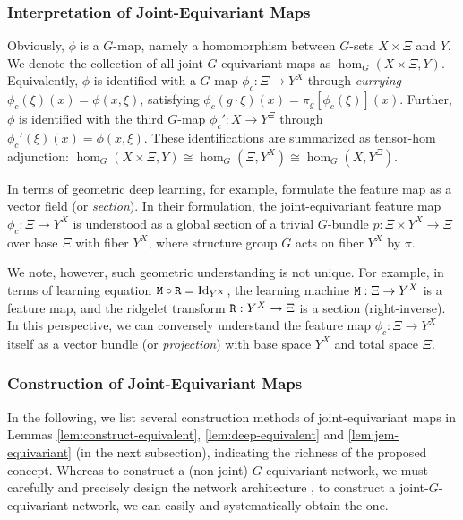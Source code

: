 \subsubsection{Interpretation of Joint-Equivariant Maps} \label{sec:interpretation}
Obviously, 
$\phi$ is a $G$-map, namely a homomorphism between $G$-sets $X \times \Xi$ and $Y$. We denote the collection of all joint-$G$-equivariant maps as $\hom_G(X \times \Xi, Y)$.
Equivalently, 
$\phi$ is identified with a $G$-map $\phi_c:\Xi \to Y^X$ through \emph{currying} $\phi_c(\xi)(x) = \phi(x,\xi)$, satisfying $\phi_c(g \cdot \xi)(x) = \pi_g[\phi_c(\xi)](x)$.
Further, $\phi$ is identified with the third $G$-map $\phi_c':X \to Y^\Xi$ through $\phi_c'(\xi)(x) = \phi(x,\xi)$.
These identifications are summarized as tensor-hom adjunction: $\hom_G(X \times \Xi, Y) \cong \hom_G(\Xi, Y^X) \cong \hom_G(X, Y^\Xi)$.

In terms of geometric deep learning, for example, \citet{Cohen2019} formulate the feature map as a vector field (or \emph{section}). In their formulation, the joint-equivariant feature map $\phi_c : \Xi \to Y^X$ is understood as a global section of a trivial $G$-bundle $p:\Xi \times Y^X \to \Xi$ over base $\Xi$ with fiber $Y^X$, where structure group $G$ acts on fiber $Y^X$ by $\pi$.

We note, however, such geometric understanding is not unique. For example, in terms of learning equation $\mathtt{M} \circ \mathtt{R} = \operatorname{Id}_{Y^X}$, the learning machine $\mathtt{M} : \Xi \to Y^X$ is a feature map, and the ridgelet transform $\mathtt{R}:Y^X \to \Xi$ is a section (right-inverse). In this perspective, we can conversely understand the feature map $\phi_c : \Xi \to Y^X$ itself as a vector bundle (or \emph{projection}) with base space $Y^X$ and total space $\Xi$.



\subsubsection{Construction of Joint-Equivariant Maps}
In the following, we list several construction methods of joint-equivariant maps in Lemmas \ref{lem:construct-equivalent}, \ref{lem:deep-equivalent} and \ref{lem:jem-equivariant} (in the next subsection), indicating the richness of the proposed concept. Whereas to construct a (non-joint) $G$-equivariant network, we must carefully and precisely design the network architecture \citep[see, e.g., a textbook of geometric deep learning][]{Bronstein2021gdl}, to construct a joint-$G$-equivariant network, we can easily and systematically obtain the one. 

